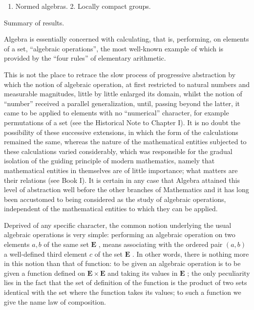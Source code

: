 
\begin{enumerate}
\def\labelenumi{\arabic{enumi}.}
\tightlist
\item
  Normed algebras. 2. Locally compact groups.
\end{enumerate}


Summary of results.


Algebra is essentially concerned with calculating, that is, performing, on elements of a set, ``algebraic operations'', the most well-known example of which is provided by the ``four rules'' of elementary arithmetic.

This is not the place to retrace the slow process of progressive abstraction by which the notion of algebraic operation, at first restricted to natural numbers and measurable magnitudes, little by little enlarged its domain, whilst the notion of ``number'' received a parallel generalization, until, passing beyond the latter, it came to be applied to elements with no ``numerical'' character, for example permutations of a set (see the Historical Note to Chapter I). It is no doubt the possibility of these successive extensions, in which the form of the calculations remained the same, whereas the nature of the mathematical entities subjected to these calculations varied considerably, which was responsible for the gradual isolation of the guiding principle of modern mathematics, namely that mathematical entities in themselves are of little importance; what matters are their relations (see Book I). It is certain in any case that Algebra attained this level of abstraction well before the other branches of Mathematics and it has long been accustomed to being considered as the study of algebraic operations, independent of the mathematical entities to which they can be applied.

Deprived of any specific character, the common notion underlying the usual algebraic operations is very simple: performing an algebraic operation on two elements \(a, b\) of the same set \(\mathbf{E}\) , means associating with the ordered pair \((a, b)\) a well-defined third element \(c\) of the set \(\mathbf{E}\) . In other words, there is nothing more in this notion than that of function: to be given an algebraic operation is to be given a function defined on \(\mathbf{E} \times \mathbf{E}\) and taking its values in \(\mathbf{E}\) ; the only peculiarity lies in the fact that the set of definition of the function is the product of two sets identical with the set where the function takes its values; to such a function we give the name law of composition.

